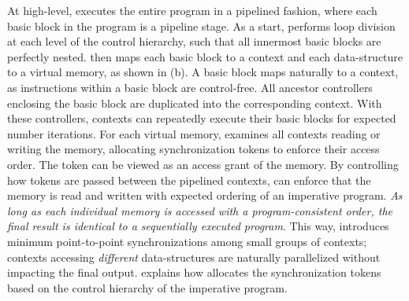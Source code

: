At high-level, \name executes the entire program in a pipelined fashion, where each basic block
in the program is a pipeline stage.
As a start, \name performs loop division at each level of the control hierarchy, such that all
innermost basic blocks are perfectly nested. \name then maps each basic block to a context and each
data-structure to a virtual memory, as shown in  (b).
A basic block maps naturally to a context, as instructions within a basic block are control-free. 
All ancestor controllers enclosing the basic block are duplicated into the corresponding context.
With these controllers, contexts can repeatedly execute their basic blocks for expected number iterations. 
For each virtual memory, \name examines all contexts reading or writing the memory,
allocating synchronization tokens to enforce their access order.
The token can be viewed as an access grant of the memory.
By controlling how tokens are passed between the pipelined contexts, \name can enforce 
that the memory is read and written with expected ordering of an imperative program.
\emph{As long as each individual memory is accessed with a program-consistent
order, the final result is identical to a sequentially executed program}.
This way, \name introduces minimum point-to-point synchronizations among small groups of contexts; contexts
accessing \emph{different} data-structures are naturally parallelized without impacting the final output.
 explains how \name allocates the synchronization tokens based on the control
hierarchy of the imperative program.

